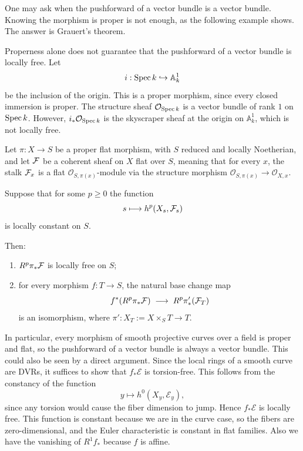 \documentclass[12pt]{article}
\begin{document}
One may ask when the pushforward of a vector bundle is a vector bundle. Knowing the morphism is proper is not enough, as the following example shows. The answer is Grauert's theorem.

\begin{example}
    Properness alone does not guarantee that the pushforward of a vector bundle is locally free. Let
    \[
        i:\operatorname{Spec} k \hookrightarrow \mathbb A^1_k
    \]
    be the inclusion of the origin. This is a proper morphism, since every closed immersion is proper. The structure sheaf $\mathcal O_{\operatorname{Spec} k}$
    is a vector bundle of rank $1$ on $\operatorname{Spec} k$. However, $i_*\mathcal O_{\operatorname{Spec} k}$
    is the skyscraper sheaf at the origin on $\mathbb A^1_k$, which is not locally free.
\end{example}

\begin{theorem}[Grauert]\label{thm:grauert}
    Let $\pi : X \to S$ be a proper flat morphism, with $S$ reduced and locally Noetherian, and let ${\mathcal{F}}$ be a coherent sheaf on $X$ flat over $S$, meaning that for every $x$, the stalk ${\mathcal{F}}_x$ is a flat $\mathcal O_{S,\pi(x)}$-module via the structure morphism $\mathcal O_{S,\pi(x)} \to \mathcal O_{X,x}$.

    Suppose that for some $p\ge0$ the function
    \[
        s \longmapsto h^p(X_s,{\mathcal{F}}_s)
    \]
    is locally constant on $S$.

    Then:
    \begin{enumerate}
        \item $R^p\pi_*{\mathcal{F}}$ is locally free on $S$;
        \item for every morphism $f:T\to S$, the natural base change map
              \[
                  f^*(R^p\pi_*{\mathcal{F}})\;\longrightarrow\;R^p\pi'_*({\mathcal{F}}_T)
              \]
              is an isomorphism, where $\pi':X_T:=X\times_S T\to T$.
    \end{enumerate}
\end{theorem}
In particular, every morphism of smooth projective curves over a field is proper and flat, so the pushforward of a vector bundle is always a vector bundle. This could also be seen by a direct argument. Since the local rings of a smooth curve are DVRs, it suffices to show that $f_*\mathcal E$ is torsion-free. This follows from the constancy of the function
\[
    y \mapsto h^0(X_y,\mathcal E_y),
\]
since any torsion would cause the fiber dimension to jump. Hence $f_*\mathcal E$ is locally free. This function is constant because we are in the curve case, so the fibers are zero-dimensional, and the Euler characteristic is constant in flat families. Also we have the vanishing of $R^1f_*$ because $f$ is affine.
\end{document}
